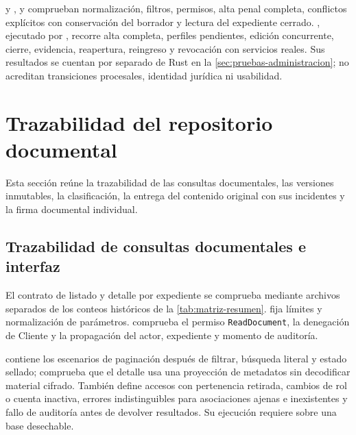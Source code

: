 {\raggedright {} y ,  y  comprueban normalización, filtros, permisos, alta penal completa, conflictos explícitos con conservación del borrador y lectura del expediente cerrado. , ejecutado por , recorre alta completa, perfiles pendientes, edición concurrente, cierre, evidencia, reapertura, reingreso y revocación con servicios reales. Sus resultados se cuentan por separado de Rust en la \cref{sec:pruebas-administracion}; no acreditan transiciones procesales, identidad jurídica ni usabilidad.\par}



\section{Trazabilidad del repositorio documental}\label{sec:matriz-grupo-documentos}

Esta sección reúne la trazabilidad de las consultas documentales, las versiones inmutables, la clasificación, la entrega del contenido original con sus incidentes y la firma documental individual.

\subsection{Trazabilidad de consultas documentales e interfaz}\label{sec:matriz-consultas}

El contrato de listado y detalle por expediente se comprueba mediante archivos separados de los conteos históricos de la \cref{tab:matriz-resumen}.  fija límites y normalización de parámetros.  comprueba el permiso \texttt{ReadDocument}, la denegación de Cliente y la propagación del actor, expediente y momento de auditoría.

 contiene los escenarios de paginación después de filtrar, búsqueda literal y estado sellado; comprueba que el detalle usa una proyección de metadatos sin decodificar material cifrado. También define accesos con pertenencia retirada, cambios de rol o cuenta inactiva, errores indistinguibles para asociaciones ajenas e inexistentes y fallo de auditoría antes de devolver resultados. Su ejecución requiere  sobre una base desechable.

